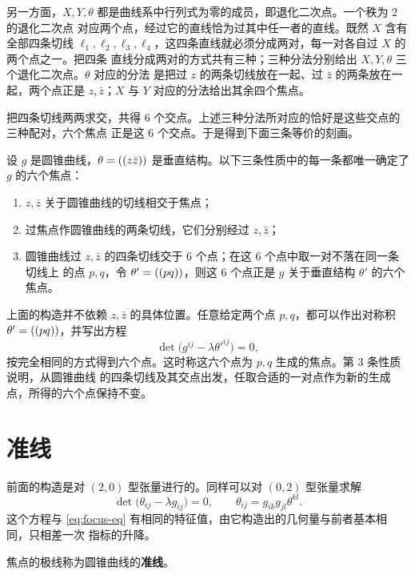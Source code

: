 另一方面，$X,Y,\theta$ 都是曲线系中行列式为零的成员，即退化二次点。一个秩为 $2$ 的退化二次点
对应两个点，经过它的直线恰为过其中任一者的直线。既然 $X$ 含有全部四条切线
$\ell_1,\ell_2,\ell_3,\ell_4$，这四条直线就必须分成两对，每一对各自过 $X$ 的两个点之一。把四条
直线分成两对的方式共有三种；三种分法分别给出 $X,Y,\theta$ 三个退化二次点。$\theta$ 对应的分法
是把过 $z$ 的两条切线放在一起、过 $\bar z$ 的两条放在一起，两个点正是 $z,\bar z$；$X$ 与 $Y$
对应的分法给出其余四个焦点。

把四条切线两两求交，共得 $6$ 个交点。上述三种分法所对应的恰好是这些交点的三种配对，六个焦点
正是这 $6$ 个交点。于是得到下面三条等价的刻画。

\begin{proposition}[焦点的几何刻画]
设 $g$ 是圆锥曲线，$\theta=((z\bar z))$ 是垂直结构。以下三条性质中的每一条都唯一确定了
$g$ 的六个焦点：
\begin{enumerate}
\item $z,\bar z$ 关于圆锥曲线的切线相交于焦点；
\item 过焦点作圆锥曲线的两条切线，它们分别经过 $z,\bar z$；
\item 圆锥曲线过 $z,\bar z$ 的四条切线交于 $6$ 个点；在这 $6$ 个点中取一对不落在同一条切线上
的点 $p,q$，令 $\theta'=((pq))$，则这 $6$ 个点正是 $g$ 关于垂直结构 $\theta'$ 的六个焦点。
\end{enumerate}
\end{proposition}

\begin{remark}[一般的生成点]
上面的构造并不依赖 $z,\bar z$ 的具体位置。任意给定两个点 $p,q$，都可以作出对称积
$\theta'=((pq))$，并写出方程
\[
\det\bigl(g^{ij}-\lambda\theta'^{ij}\bigr)=0,
\]
按完全相同的方式得到六个点。这时称这六个点为 $p,q$ 生成的焦点。第 $3$ 条性质说明，从圆锥曲线
的四条切线及其交点出发，任取合适的一对点作为新的生成点，所得的六个点保持不变。
\end{remark}

\section{准线}

前面的构造是对 $(2,0)$ 型张量进行的。同样可以对 $(0,2)$ 型张量求解
\[
\det\bigl(\theta_{ij}-\lambda g_{ij}\bigr)=0,
\qquad
\theta_{ij}=g_{ik}g_{jl}\theta^{kl}.
\]
这个方程与 \eqref{eq:focus-eq} 有相同的特征值，由它构造出的几何量与前者基本相同，只相差一次
指标的升降。

\begin{definition}[准线]
焦点的极线称为圆锥曲线的\textbf{准线}。
\end{definition}


